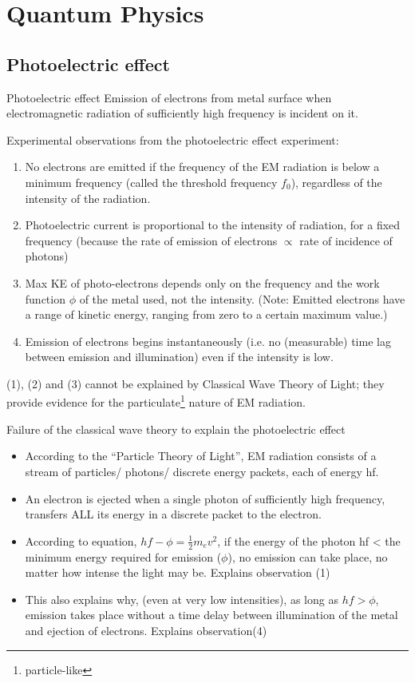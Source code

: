 \section{Quantum Physics}
\subsection{Photoelectric effect}
\begin{defn}{Photoelectric effect}{}
Emission of electrons from metal surface when electromagnetic radiation of sufficiently high frequency is incident on it.
\end{defn}

Experimental observations from the photoelectric effect experiment:
\begin{enumerate}
\item No electrons are emitted if the frequency of the EM radiation is below a minimum frequency (called the threshold frequency $f_0$), regardless of the intensity of the radiation.
\item Photoelectric current is proportional to the intensity of radiation, for a fixed frequency (because the rate of emission of electrons $\propto$ rate of incidence of photons)
\item Max KE of photo-electrons depends only on the frequency and the work function $\phi$ of the metal used, not the intensity. (Note: Emitted electrons have a range of kinetic energy, ranging from zero to a certain maximum value.)
\item Emission of electrons begins instantaneously (i.e. no (measurable) time lag between emission and illumination) even if the intensity is low.
\end{enumerate}

(1), (2) and (3) cannot be explained by Classical Wave Theory of Light; they provide evidence for the particulate\footnote{particle-like} nature of EM radiation.

Failure of the classical wave theory to explain the photoelectric effect
\begin{itemize}
\item According to the “Particle Theory of Light”, EM radiation consists of a stream of particles/ photons/ discrete energy packets, each of energy hf.
\item An electron is ejected when a single photon of sufficiently high frequency, transfers ALL its energy in a discrete packet to the electron.
\item According to equation, $hf - \phi = \frac{1}{2}m_ev^2$, if the energy of the photon hf < the minimum energy required for emission ($\phi$), no emission can take place, no matter how intense the light may be. {Explains observation (1)}
\item This also explains why, (even at very low intensities), as long as $hf > \phi$, emission takes place without a time delay between illumination of the metal and ejection of electrons. {Explains observation(4)}
\end{itemize}

